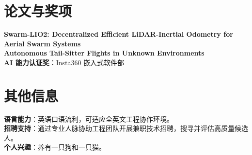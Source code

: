 \documentclass[letterpaper,11pt]{article}
\begin{document}
\section{论文与奖项}
  \begin{itemize}[leftmargin=0.15in, label={}, nosep]
    \small{\item{
      \textbf{Swarm-LIO2: Decentralized Efficient LiDAR-Inertial Odometry for Aerial Swarm Systems} \\
      \textbf{Autonomous Tail-Sitter Flights in Unknown Environments} \\
      \textbf{AI 能力认证奖}{：Insta360 嵌入式软件部}
    }}
 \end{itemize}

\section{其他信息}
  \begin{itemize}[leftmargin=0.15in, label={}, nosep]
    \small{\item{
      \textbf{语言能力}{：英语口语流利，可适应全英文工程协作环境。} \\
      \textbf{招聘支持}{：通过专业人脉协助工程团队开展兼职技术招聘，搜寻并评估高质量候选人。} \\
      \textbf{个人兴趣}{：养有一只狗和一只猫。}
    }}
 \end{itemize}

\end{document}
